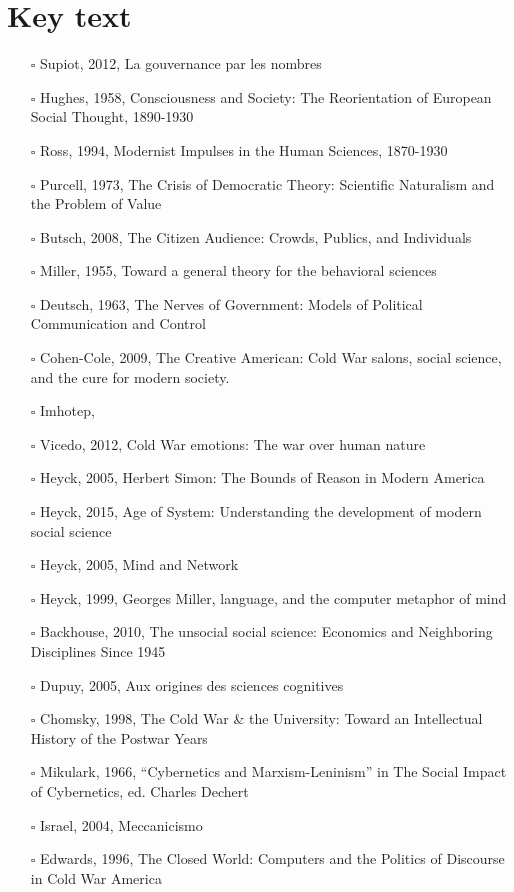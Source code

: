 \documentclass[paper=B6,portrait,twoside=true,twocolumn=false,headinclude=true,footinclude=false,fontsize=12,BCOR=10mm,DIV=calc,pagesize=auto,titlepage=firstiscover,mpinclude=false,headings=normal,headings=twolinechapter,open=right,toc=graduated,chapterprefix=false,numbers=endperiod,parskip=half+]{scrbook}
\theoremstyle{definition}
\begin{document}
\section{Key text}
\label{sec:orgb4ddc28}
\begin{itemize}
\item[{$\square$}] Supiot, 2012, La gouvernance par les nombres
\item[{$\square$}] Hughes, 1958, Consciousness and Society: The Reorientation of European Social Thought, 1890-1930
\item[{$\square$}] Ross, 1994, Modernist Impulses in the Human Sciences, 1870-1930
\item[{$\square$}] Purcell, 1973, The Crisis of Democratic Theory: Scientific Naturalism and the Problem of Value
\item[{$\square$}] Butsch, 2008, The Citizen Audience: Crowds, Publics, and Individuals
\item[{$\square$}] Miller, 1955, Toward a general theory for the behavioral sciences
\item[{$\square$}] Deutsch, 1963, The Nerves of Government: Models of Political Communication and Control
\item[{$\square$}] Cohen-Cole, 2009, The Creative American: Cold War salons, social science, and the cure for modern society.
\item[{$\square$}] Imhotep,
\item[{$\square$}] Vicedo, 2012, Cold War emotions: The war over human nature
\item[{$\square$}] Heyck, 2005, Herbert Simon: The Bounds of Reason in Modern America
\item[{$\square$}] Heyck, 2015, Age of System: Understanding the development of modern social science
\item[{$\square$}] Heyck, 2005, Mind and Network
\item[{$\square$}] Heyck, 1999, Georges Miller, language, and the computer metaphor of mind
\item[{$\square$}] Backhouse, 2010, The unsocial social science: Economics and Neighboring Disciplines Since 1945
\item[{$\square$}] Dupuy, 2005, Aux origines des sciences cognitives
\item[{$\square$}] Chomsky, 1998, The Cold War \& the University: Toward an Intellectual History of the Postwar Years
\item[{$\square$}] Mikulark, 1966, ``Cybernetics and Marxism-Leninism'' in The Social Impact of Cybernetics, ed. Charles Dechert
\item[{$\square$}] Israel, 2004, Meccanicismo
\item[{$\square$}] Edwards, 1996, The Closed World: Computers and the Politics of Discourse in Cold War America
\end{itemize}
\end{document}
